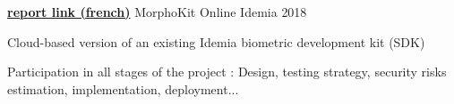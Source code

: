 \documentclass[11pt, a4paper]{awesome-cv}
\begin{document}
\begin{cventries}
  \cventry
  {\href{https://drive.google.com/open?id=1q9ahp9iRNREYmjb1pVUp9wJLECDwfH35}{\textbf{report link (french)}}}
  {MorphoKit Online}
  {Idemia}
  {2018}
  {
    \begin{cvitems}
      \item Cloud-based version of an existing Idemia biometric development kit (SDK)
      \item Participation in all stages of the project : Design, testing strategy, security risks estimation, implementation, deployment...
    \end{cvitems}
  }

\end{cventries}
\end{document}
